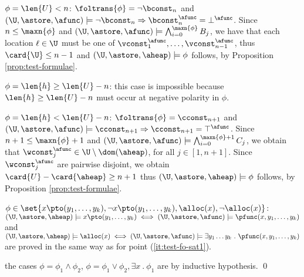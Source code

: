 {\begin{compactitem}
    \item $\phi = \len{U} < n$: $\foltrans{\phi} = \neg\bconst_n$ and
      $(\U,\astore,\afunc) \models \neg\bconst_n \Rightarrow
      \bconst_n^\afunc = \bot^\afunc$. Since $n \leq \maxn{\phi}$ and
      $(\U,\astore,\afunc) \models \bigwedge_{i=0}^{\maxn{\phi}} B_j$,
      we have that each location $\ell\in\U$ must be one of
      $\vconst_1^\afunc, \ldots, \vconst_{n-1}^\afunc$, thus
      $\card{\U} \leq n-1$ and $(\U,\astore,\aheap) \models \phi$
      follows, by Proposition \ref{prop:test-formulae}.
    \item $\phi = \len{h} \geq \len{U} - n$: this case is impossible
      because $\len{h} \geq \len{U} - n$ must occur at negative
      polarity in $\phi$.
    \item $\phi = \len{h} < \len{U} - n$: $\foltrans{\phi} =
      \cconst_{n+1}$ and $(\U,\astore,\afunc) \models \cconst_{n+1}
      \Rightarrow \cconst_{n+1} = \top^\afunc$.  Since $n+1 \leq
      \maxn{\phi}+1$ and $(\U,\astore,\afunc) \models
      \bigwedge_{i=0}^{\maxn{\phi}+1} C_j$, we obtain that
      $\wconst_j^\afunc \in \U \setminus \dom(\aheap)$, 
      for all $j \in [1,n+1]$. Since $\wconst_j^\afunc$ are pairwise
      disjoint, we obtain $\card{U} - \card{\aheap} \geq n+1$
      thus $(\U, \astore, \aheap) \models \phi$ follows, by
      Proposition \ref{prop:test-formulae}.
    \item $\phi \in \set{x \pto (y_1,\ldots,y_k), \neg x \pto
      (y_1,\ldots,y_k), \alloc(x), \neg\alloc(x)}$:
      $(\U,\astore,\aheap) \models x \pto (y_1,\ldots,y_k) \iff
      (\U,\astore,\afunc) \models \pfunc(x,y_1,\ldots,y_k)$ and
      $(\U,\astore,\aheap) \models \alloc(x) \iff (\U,\astore,\afunc)
      \models \exists y_1 \ldots y_k ~.~ \pfunc(x,y_1,\ldots,y_k)$ are
      proved in the same way as for point (\ref{it:test-fo-sat1}).
    \item the cases $\phi = \phi_1 \wedge \phi_2$, $\phi = \phi_1
      \vee \phi_2, \exists x ~.~ \phi_1$ are by inductive
      hypothesis. \qed
\end{compactitem}}

